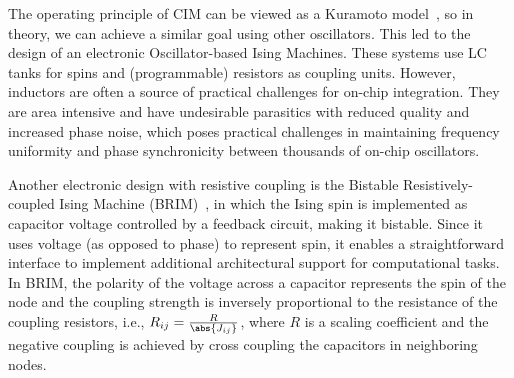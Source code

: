  The operating principle of CIM can be viewed as a Kuramoto model~\cite{Takeda_2017},  so in theory, we can achieve a similar goal using other oscillators. This led to the design of an electronic Oscillator-based Ising Machines. These systems use LC tanks for spins and (programmable) resistors as coupling units. However, inductors are often a source of practical challenges for on-chip integration. They are area intensive and have undesirable parasitics with reduced quality and increased phase noise, which poses practical challenges in maintaining frequency uniformity and phase synchronicity between thousands of on-chip oscillators. 


Another electronic design with resistive coupling is the Bistable Resistively-coupled Ising Machine (BRIM)~\cite{afoakwa.hpca21}, in which the Ising spin is implemented as capacitor voltage controlled by a feedback circuit, making it bistable. Since it uses voltage (as opposed to phase) to represent spin, it enables a straightforward interface to implement additional architectural support for computational tasks. In BRIM, the polarity of the voltage across a capacitor represents the spin of the node and the coupling strength is inversely proportional to the resistance of the coupling resistors, i.e., $R_{ij}=\frac{R}{\abs{J_{ij}}}$, where $R$ is a scaling coefficient and the negative coupling is achieved by cross coupling the capacitors in neighboring nodes.

